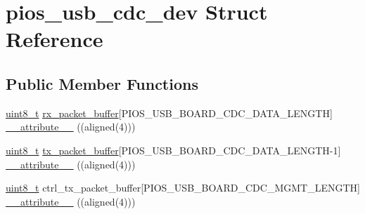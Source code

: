 \hypertarget{structpios__usb__cdc__dev}{\section{pios\-\_\-usb\-\_\-cdc\-\_\-dev Struct Reference}
\label{structpios__usb__cdc__dev}
}
\subsection*{Public Member Functions}
\begin{DoxyCompactItemize}
\item 
\hyperlink{stdint_8h_aba7bc1797add20fe3efdf37ced1182c5}{uint8\-\_\-t} \hyperlink{group___p_i_o_s___u_s_b___c_o_m_ga82f6a571f9bf92fae2d7368be2407a27}{rx\-\_\-packet\-\_\-buffer}\mbox{[}P\-I\-O\-S\-\_\-\-U\-S\-B\-\_\-\-B\-O\-A\-R\-D\-\_\-\-C\-D\-C\-\_\-\-D\-A\-T\-A\-\_\-\-L\-E\-N\-G\-T\-H\mbox{]} \hyperlink{group___p_i_o_s___u_s_b___c_o_m_gab58a69ef6ffba4b36cf99ba5dfd9798c}{\-\_\-\-\_\-attribute\-\_\-\-\_\-} ((aligned(4)))
\item 
\hyperlink{stdint_8h_aba7bc1797add20fe3efdf37ced1182c5}{uint8\-\_\-t} \hyperlink{group___p_i_o_s___u_s_b___c_o_m_ga1b086465e042517001948516cfa908d1}{tx\-\_\-packet\-\_\-buffer}\mbox{[}P\-I\-O\-S\-\_\-\-U\-S\-B\-\_\-\-B\-O\-A\-R\-D\-\_\-\-C\-D\-C\-\_\-\-D\-A\-T\-A\-\_\-\-L\-E\-N\-G\-T\-H-\/1\mbox{]} \hyperlink{structpios__usb__cdc__dev_gab58a69ef6ffba4b36cf99ba5dfd9798c}{\-\_\-\-\_\-attribute\-\_\-\-\_\-} ((aligned(4)))
\item 
\hyperlink{stdint_8h_aba7bc1797add20fe3efdf37ced1182c5}{uint8\-\_\-t} ctrl\-\_\-tx\-\_\-packet\-\_\-buffer\mbox{[}P\-I\-O\-S\-\_\-\-U\-S\-B\-\_\-\-B\-O\-A\-R\-D\-\_\-\-C\-D\-C\-\_\-\-M\-G\-M\-T\-\_\-\-L\-E\-N\-G\-T\-H\mbox{]} \hyperlink{structpios__usb__cdc__dev_gab58a69ef6ffba4b36cf99ba5dfd9798c}{\-\_\-\-\_\-attribute\-\_\-\-\_\-} ((aligned(4)))
\end{DoxyCompactItemize}
